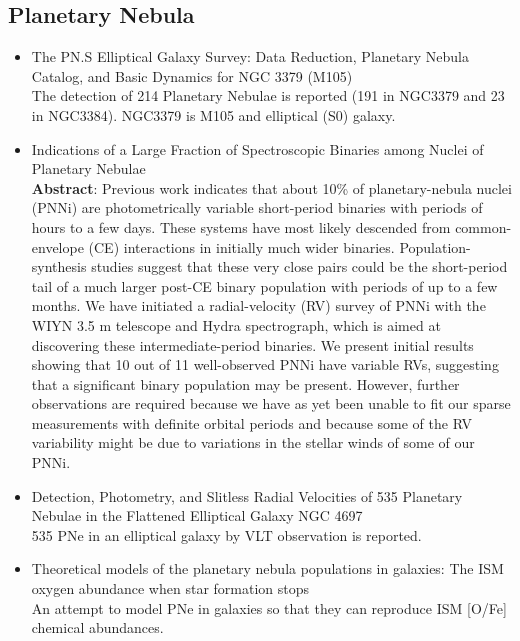 \subsection{Planetary Nebula}
\begin{itemize}
\item The PN.S Elliptical Galaxy Survey: Data Reduction, Planetary Nebula 
Catalog, and Basic Dynamics for NGC 3379 (M105)\citep{douglas07a}\\
The detection of 214 Planetary Nebulae is reported (191 in NGC3379 and 23
in NGC3384). NGC3379 is M105 and elliptical (S0) galaxy.

\item  Indications of a Large Fraction of Spectroscopic Binaries among Nuclei 
of Planetary Nebulae \citep[][\#48, 5/21/10, demarco04a]{demarco04a}\\
{\bf Abstract}:
Previous work indicates that about 10\% of planetary-nebula nuclei (PNNi) are photometrically variable short-period binaries with periods of hours to a few days. These systems have most likely descended from common-envelope (CE) interactions in initially much wider binaries. Population-synthesis studies suggest that these very close pairs could be the short-period tail of a much larger post-CE binary population with periods of up to a few months. We have initiated a radial-velocity (RV) survey of PNNi with the WIYN 3.5 m telescope and Hydra spectrograph, which is aimed at discovering these intermediate-period binaries. We present initial results showing that 10 out of 11 well-observed PNNi have variable RVs, suggesting that a significant binary population may be present. However, further observations are required because we have as yet been unable to fit our sparse measurements with definite orbital periods and because some of the RV variability might be due to variations in the stellar winds of some of our PNNi. 

\item Detection, Photometry, and Slitless Radial Velocities of 535 Planetary Nebulae 
in the Flattened Elliptical Galaxy NGC 4697 
\citep[][\#67, 5/25/10]{mendez01a} \\
535 PNe in an elliptical galaxy by VLT observation is reported.

\item Theoretical models of the planetary nebula populations in galaxies: The ISM oxygen abundance 
when star formation stops \citep{richer97a}\\
An attempt to model PNe in galaxies so that they can reproduce ISM [O/Fe]
chemical abundances.
\end{itemize}


